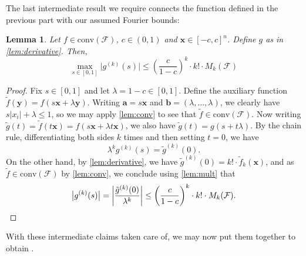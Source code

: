 \documentclass[10pt,a4paper]{article}
\newtheorem{lemma}[theorem]{Lemma}
\theoremstyle{definition}
\begin{document}
The last intermediate result we require connects the function defined in the previous part with our assumed Fourier bounds:
    \begin{lemma}
    \label{lemma:finallem}
        Let $f \in \mathrm{conv}(\mathcal{F}) $, $c \in (0,1) $ and $\mathbf{x} \in [ -c , c]^n $. 
        Define $g$ as in \cref{lem:derivative}. 
        Then, 
        \begin{equation*}
            \max _{s \in[0,1]} \bigl| g^{(k)}(s) \bigr|
            \leq\left(\frac{c}{1-c}\right)^{k} \cdot k! \cdot M_{k}(\mathcal{F})
        \end{equation*}
    \end{lemma}
    \begin{proof}
        Fix $s \in [ 0,1]$ and let $\lambda=1-c \in [0,1]$.  Define the auxiliary function $\tilde{f}(\mathbf{y})=f(s\mathbf{x}+\lambda\mathbf{y})$. Writing $\mathbf{a}=s\mathbf{x}$ and $\mathbf{b}=(\lambda,\ldots,\lambda)$, we clearly have $s |x_i| + \lambda \leq 1$, so we may apply \cref{lem:conv} to see that $\tilde{f}\in \mathrm{conv}(\mathcal{F})$.
        Now writing $\tilde{g}(t) = \tilde{f}(t\mathbf{x})=f(s\mathbf{x}+\lambda t\mathbf{x})$, we also have $\tilde{g}(t)=g(s+t\lambda)$. By the chain rule, differentiating both sides $k$ times and then setting $t=0$, we have
        \begin{equation*}
            \lambda^k g^{(k)}(s)=\tilde{g}^{(k)}(0).
        \end{equation*}
        On the other hand, by \cref{lem:derivative}, we have $\tilde{g}^{(k)}(0)=k!\cdot \tilde{f}_k(\mathbf{x})$, and as $\tilde{f}\in \mathrm{conv}(\mathcal{F})$ by \cref{lem:conv}, we conclude using \cref{lem:mult} that
        \[
            \bigl|g^{(k)}(s)\bigr|=\left|\frac{\tilde{g}^{(k)}(0)}{\lambda^k}\right|\leq \left(\frac{c}{1-c}\right)^k \cdot k!\cdot M_k(\mathcal{F}) . \qedhere
        \]
    \end{proof}
    With these intermediate claims taken care of, we may now put them together to obtain .
\end{document}
